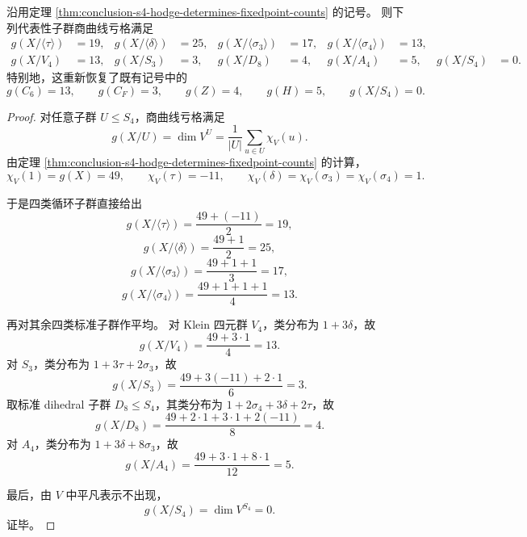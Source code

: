 \begin{theorem}\label{thm:conclusion-s4-hodge-recovers-standard-quotient-genera}
沿用定理 \ref{thm:conclusion-s4-hodge-determines-fixedpoint-counts} 的记号。
则下列代表性子群商曲线亏格满足
\[
\boxed{
\begin{aligned}
g(X/\langle\tau\rangle)&=19,&
g(X/\langle\delta\rangle)&=25,&
g(X/\langle\sigma_3\rangle)&=17,&
g(X/\langle\sigma_4\rangle)&=13,\\
g(X/V_4)&=13,&
g(X/S_3)&=3,&
g(X/D_8)&=4,&
g(X/A_4)&=5,&
g(X/S_4)&=0.
\end{aligned}}
\]
特别地，这重新恢复了既有记号中的
\[
g(C_6)=13,\qquad
g(C_F)=3,\qquad
g(Z)=4,\qquad
g(H)=5,
\qquad
g(X/S_4)=0.
\]
\end{theorem}
\begin{proof}
对任意子群 \(U\le S_4\)，商曲线亏格满足
\[
g(X/U)=\dim V^U=\frac{1}{|U|}\sum_{u\in U}\chi_V(u).
\]
由定理 \ref{thm:conclusion-s4-hodge-determines-fixedpoint-counts} 的计算，
\[
\chi_V(1)=g(X)=49,\qquad
\chi_V(\tau)=-11,\qquad
\chi_V(\delta)=\chi_V(\sigma_3)=\chi_V(\sigma_4)=1.
\]

于是四类循环子群直接给出
\[
g(X/\langle\tau\rangle)=\frac{49+(-11)}{2}=19,
\]
\[
g(X/\langle\delta\rangle)=\frac{49+1}{2}=25,
\]
\[
g(X/\langle\sigma_3\rangle)=\frac{49+1+1}{3}=17,
\]
\[
g(X/\langle\sigma_4\rangle)=\frac{49+1+1+1}{4}=13.
\]

再对其余四类标准子群作平均。
对 Klein 四元群 \(V_4\)，类分布为
\(
1+3\delta
\)，故
\[
g(X/V_4)=\frac{49+3\cdot 1}{4}=13.
\]
对 \(S_3\)，类分布为
\(
1+3\tau+2\sigma_3
\)，故
\[
g(X/S_3)=\frac{49+3(-11)+2\cdot 1}{6}=3.
\]
取标准 dihedral 子群 \(D_8\le S_4\)，其类分布为
\(
1+2\sigma_4+3\delta+2\tau
\)，故
\[
g(X/D_8)=\frac{49+2\cdot 1+3\cdot 1+2(-11)}{8}=4.
\]
对 \(A_4\)，类分布为
\(
1+3\delta+8\sigma_3
\)，故
\[
g(X/A_4)=\frac{49+3\cdot 1+8\cdot 1}{12}=5.
\]

最后，由 \(V\) 中平凡表示不出现，
\[
g(X/S_4)=\dim V^{S_4}=0.
\]
证毕。
\end{proof}

